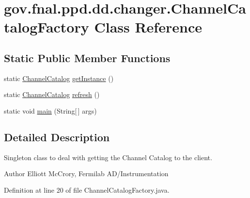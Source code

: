 \hypertarget{classgov_1_1fnal_1_1ppd_1_1dd_1_1changer_1_1ChannelCatalogFactory}{\section{gov.\-fnal.\-ppd.\-dd.\-changer.\-Channel\-Catalog\-Factory Class Reference}
\label{classgov_1_1fnal_1_1ppd_1_1dd_1_1changer_1_1ChannelCatalogFactory}
}
\subsection*{Static Public Member Functions}
\begin{DoxyCompactItemize}
\item 
static \hyperlink{interfacegov_1_1fnal_1_1ppd_1_1dd_1_1interfaces_1_1ChannelCatalog}{Channel\-Catalog} \hyperlink{classgov_1_1fnal_1_1ppd_1_1dd_1_1changer_1_1ChannelCatalogFactory_ac77dd407ecb474093b11431593b52540}{get\-Instance} ()
\item 
static \hyperlink{interfacegov_1_1fnal_1_1ppd_1_1dd_1_1interfaces_1_1ChannelCatalog}{Channel\-Catalog} \hyperlink{classgov_1_1fnal_1_1ppd_1_1dd_1_1changer_1_1ChannelCatalogFactory_a10180eb261e098698ee6c87b0d530380}{refresh} ()
\item 
static void \hyperlink{classgov_1_1fnal_1_1ppd_1_1dd_1_1changer_1_1ChannelCatalogFactory_acc9cbf325f30beadd4c3e227deb94c21}{main} (String\mbox{[}$\,$\mbox{]} args)
\end{DoxyCompactItemize}


\subsection{Detailed Description}
Singleton class to deal with getting the Channel Catalog to the client.

\begin{DoxyAuthor}{Author}
Elliott Mc\-Crory, Fermilab A\-D/\-Instrumentation 
\end{DoxyAuthor}


Definition at line 20 of file Channel\-Catalog\-Factory.\-java.



